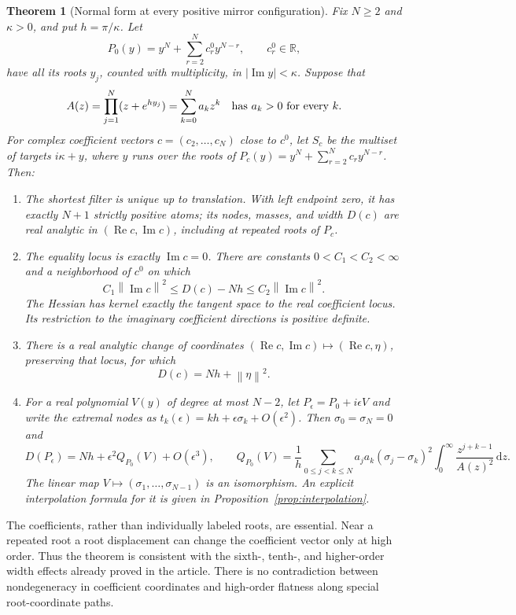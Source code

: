 \documentclass[11pt]{article}
\newtheorem{theorem}{Theorem}[section]
\theoremstyle{remark}\newtheorem{remark}[theorem]{Remark}
\newcommand{\R}{\mathbb R}\newcommand{\C}{\mathbb C}
\newcommand{\dd}{\,\mathrm d}\newcommand{\supp}{\operatorname{supp}}
\newcommand{\Rea}{\operatorname{Re}}\newcommand{\Ima}{\operatorname{Im}}
\newcommand{\norm}[1]{\left\lVert#1\right\rVert}
\newcommand{\abs}[1]{\left\lvert#1\right\rvert}
\begin{document}
\begin{theorem}[Normal form at every positive mirror configuration]
\label{thm:main}
Fix $N\ge2$ and $\kappa>0$, and put $h=\pi/\kappa$. Let
\[
 P_0(y)=y^N+\sum_{r=2}^N c_r^0y^{N-r},\qquad c_r^0\in\R,
\]
have all its roots $y_j$, counted with multiplicity, in
$\abs{\Ima y}<\kappa$. Suppose that
\[
 A(z)=\prod_{j=1}^N(z+e^{hy_j})=\sum_{k=0}^N a_kz^k
 \quad\hbox{has }a_k>0\text{ for every }k.
\]
For complex coefficient vectors $c=(c_2,\ldots,c_N)$ close to $c^0$, let
$S_c$ be the multiset of targets $i\kappa+y$, where $y$ runs over the roots
of $P_c(y)=y^N+\sum_{r=2}^N c_ry^{N-r}$. Then:
\begin{enumerate}[label=(\roman*)]
\item The shortest filter is unique up to translation. With left endpoint
zero, it has exactly $N+1$ strictly positive atoms; its nodes, masses, and
width $D(c)$ are real analytic in $(\Rea c,\Ima c)$, including at repeated
roots of $P_c$.
\item The equality locus is exactly $\Ima c=0$. There are constants
$0<C_1<C_2<\infty$ and a neighborhood of $c^0$ on which
\[
 C_1\norm{\Ima c}^2\le D(c)-Nh\le C_2\norm{\Ima c}^2.
\]
The Hessian has kernel exactly the tangent space to the real coefficient
locus. Its restriction to the imaginary coefficient directions is
positive definite.
\item There is a real analytic change of coordinates
$(\Rea c,\Ima c)\mapsto(\Rea c,\eta)$, preserving that locus, for which
\[
 \boxed{\quad D(c)=Nh+\norm{\eta}^2.\quad}
\]
\item For a real polynomial $V(y)$ of degree at most $N-2$, let
$P_\epsilon=P_0+i\epsilon V$ and write the extremal nodes as
$t_k(\epsilon)=kh+\epsilon\sigma_k+O(\epsilon^2)$. Then
$\sigma_0=\sigma_N=0$ and
\begin{equation}\label{eq:energy}
 D(P_\epsilon)=Nh+\epsilon^2 Q_{P_0}(V)+O(\epsilon^3),\qquad
 Q_{P_0}(V)=\frac1h\sum_{0\le j<k\le N}
 a_ja_k(\sigma_j-\sigma_k)^2
 \int_0^\infty\frac{z^{j+k-1}}{A(z)^2}\dd z.
\end{equation}
The linear map $V\mapsto(\sigma_1,\ldots,\sigma_{N-1})$ is an isomorphism.
An explicit interpolation formula for it is given in
Proposition~\ref{prop:interpolation}.
\end{enumerate}
\end{theorem}

The coefficients, rather than individually labeled roots, are essential.
Near a repeated root a root displacement can change the coefficient vector
only at high order. Thus the theorem is consistent with the sixth-, tenth-,
and higher-order width effects already proved in the article. There is no
contradiction between nondegeneracy in coefficient coordinates and high-order
flatness along special root-coordinate paths.
\end{document}
